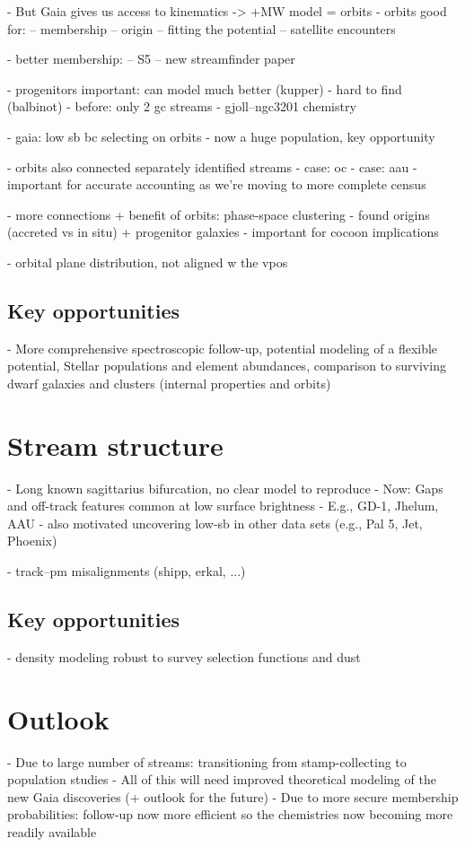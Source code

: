 \documentclass[final,5p,times,twocolumn,authoryear]{elsarticle}
\begin{document}
- But Gaia gives us access to kinematics -> +MW model = orbits
- orbits good for:
-- membership
-- origin
-- fitting the potential
-- satellite encounters

- better membership:
-- S5 \citep{li:2022}
-- new streamfinder paper


- progenitors important: can model much better (kupper)
- hard to find (balbinot)
- before: only 2 gc streams
- gjoll--ngc3201 chemistry \citep{hansen:2020}

- gaia: low sb bc selecting on orbits
- now a huge population, key opportunity

- orbits also connected separately identified streams
- case: oc
- case: aau \citep{li:2021}
- important for accurate accounting as we're moving to more complete census

- more connections + benefit of orbits: phase-space clustering \citep{bonaca:2021}
- found origins (accreted vs in situ) + progenitor galaxies
- important for cocoon implications

- orbital plane distribution, not aligned w the vpos \citep{riley:2020}

\subsection{Key opportunities}
- More comprehensive spectroscopic follow-up, potential modeling of a flexible potential, Stellar populations and element abundances, comparison to surviving dwarf galaxies and clusters (internal properties and orbits)


\section{Stream structure}
\label{sec:structure}
- Long known sagittarius bifurcation, no clear model to reproduce
- Now: Gaps and off-track features common at low surface brightness
- E.g., GD-1, Jhelum, AAU
- also motivated uncovering low-sb in other data sets (e.g., Pal 5, Jet, Phoenix)

- track--pm misalignments (shipp, erkal, ...)

\subsection{Key opportunities}
- density modeling robust to survey selection functions and dust


\section{Outlook}
\label{sec:outlook}
- Due to large number of streams: transitioning from stamp-collecting to population studies
- All of this will need improved theoretical modeling of the new Gaia discoveries (+ outlook for the future)
- Due to more secure membership probabilities: follow-up now more efficient so the chemistries now becoming more readily available







\end{document}
